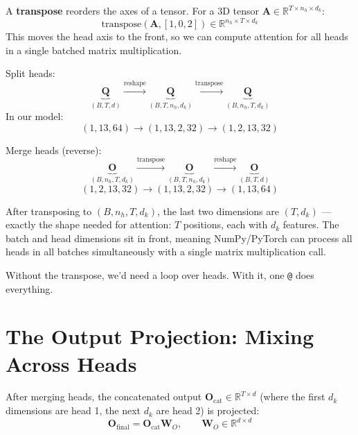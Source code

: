 \documentclass[11pt, a4paper]{article}
\newcommand{\R}{\mathbb{R}}
\newcommand{\mW}{\bm{W}}
\newcommand{\mQ}{\bm{Q}}
\newcommand{\mO}{\bm{O}}
\begin{document}
\begin{formaldef}
A \textbf{transpose} reorders the axes of a tensor. For a 3D tensor $\bm{A} \in \R^{T \times n_h \times d_k}$:
\[
\text{transpose}(\bm{A}, [1, 0, 2]) \in \R^{n_h \times T \times d_k}
\]
This moves the head axis to the front, so we can compute attention for all heads
in a single batched matrix multiplication.
\end{formaldef}

\begin{dimcheck}
Split heads:
\[
\underbrace{\mQ}_{(B, T, d)} \xrightarrow{\text{reshape}} \underbrace{\mQ}_{(B, T, n_h, d_k)} \xrightarrow{\text{transpose}} \underbrace{\mQ}_{(B, n_h, T, d_k)}
\]
In our model:
\[
(1, 13, 64) \to (1, 13, 2, 32) \to (1, 2, 13, 32)
\]

Merge heads (reverse):
\[
\underbrace{\mO}_{(B, n_h, T, d_k)} \xrightarrow{\text{transpose}} \underbrace{\mO}_{(B, T, n_h, d_k)} \xrightarrow{\text{reshape}} \underbrace{\mO}_{(B, T, d)}
\]
\[
(1, 2, 13, 32) \to (1, 13, 2, 32) \to (1, 13, 64)
\]
\end{dimcheck}

\begin{intuition}
After transposing to $(B, n_h, T, d_k)$, the last two dimensions are $(T, d_k)$ ---
exactly the shape needed for attention: $T$ positions, each with $d_k$ features.
The batch and head dimensions sit in front, meaning NumPy/PyTorch can process
all heads in all batches simultaneously with a single matrix multiplication call.

Without the transpose, we'd need a loop over heads. With it, one \texttt{@} does everything.
\end{intuition}

\section{The Output Projection: Mixing Across Heads}

\begin{formaldef}
After merging heads, the concatenated output $\mO_{\text{cat}} \in \R^{T \times d}$
(where the first $d_k$ dimensions are head 1, the next $d_k$ are head 2) is projected:
\[
\mO_{\text{final}} = \mO_{\text{cat}} \mW_O, \qquad \mW_O \in \R^{d \times d}
\]
\end{formaldef}
\end{document}
